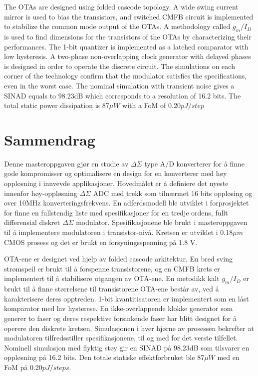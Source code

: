 \documentclass[pdftex,10pt,b5paper,twoside]{book}
\begin{document}
The OTAs are designed using folded cascode topology. A wide swing current mirror is used to bias the transistors, and switched CMFB circuit is implemented to stabilize the common mode output of the OTAs. A methodology called $g_m/I_D$ is used to find dimensions for the transistors of the OTAs by characterizing their performances. The 1-bit quantizer is implemented as a latched comparator with low hysteresis. A two-phase non-overlapping clock generator with delayed phases is designed in order to operate the discrete circuit. The simulations on each corner of the technology confirm that the modulator satisfies the specifications, even in the worst case. The nominal simulation with transient noise gives a SINAD equals to 98.23dB which corresponds to a resolution of 16.2 bits. The total static power dissipation is 87$\mu W$ with a FoM of 0.20$pJ/step$


\chapter*{Sammendrag}
Denne masteroppgaven gjør en studie av $\Delta\Sigma$ type A/D konverterer for å finne gode kompromisser og optimalisere en design for en konverterer med høy oppløsning i innvevde applikasjoner.
Hovedmålet er å definiere det nyeste innenfor høy-oppløsning $\Delta\Sigma$ ADC med trekk som tilnærmet 16 bits oppløsing og over 10MHz konverteringsfrekvens. En adferdsmodell ble utviklet i forprosjektet for finne en fullstendig liste med spesifikasjoner for en tredje ordens, fullt differensial diskret $\Delta\Sigma$ modulator. Spesifikasjonene ble brukt i masteroppgaven til å implementere modulatoren i transistor-nivå. Kretsen er utviklet i 0.18$\mu m$ CMOS prosess og det er brukt en forsyningsspenning på 1.8 V.

OTA-ene er designet ved hjelp av folded cascode arkitektur. En bred sving strømspeil er brukt til å forspenne transistorene, og en CMFB krets er implementert til å stabilisere utgangen av OTA-ene. En metodikk kalt $g_m/I_D$ er brukt til å finne størrelsene til transistorene OTA-ene består av, ved å karakterisere deres opptreden. 1-bit kvantitisatoren er implementert som en låst komparator med lav hysterese. En ikke-overlappende klokke generator som generer to faser og deres respektive forsinkende faser har blitt designet for å operere den diskrete kretsen. Simulasjonen i hver hjørne av prosessen bekrefter at modulatoren tilfredsstiller spesifikasjonene, til og med for det verste tilfellet. Nominell simulasjon med flyktig støy gir en SINAD på 98.23dB som tilsvarer en oppløsning på 16.2 bits. Den totale statiske effektforbruket ble 87$\mu W$ med en FoM på 0.20$pJ/steps$.   
\end{document}
